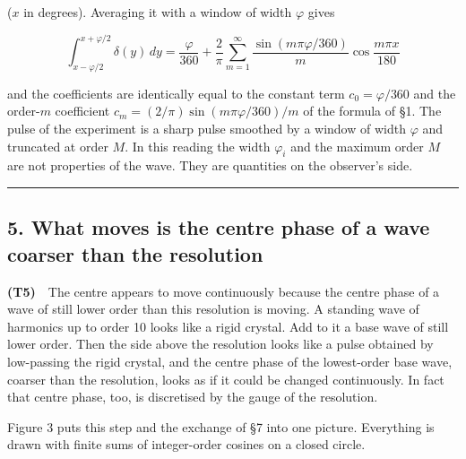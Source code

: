 \documentclass[
  a4paper,
]{article}
\begin{document}
(\(x\) in degrees). Averaging it with a window of width \(\varphi\)
gives

\[
\int_{x-\varphi/2}^{x+\varphi/2}\delta(y)\,dy=\frac{\varphi}{360}+\frac{2}{\pi}\sum_{m=1}^{\infty}\frac{\sin(m\pi\varphi/360)}{m}\cos\frac{m\pi x}{180}
\]

and the coefficients are identically equal to the constant term
\(c_0=\varphi/360\) and the order-\(m\) coefficient
\(c_m=(2/\pi)\sin(m\pi\varphi/360)/m\) of the formula of §1. The pulse
of the experiment is a sharp pulse smoothed by a window of width
\(\varphi\) and truncated at order \(M\). In this reading the width
\(\varphi_i\) and the maximum order \(M\) are not properties of the
wave. They are quantities on the observer's side.

\begin{center}\rule{0.5\linewidth}{0.5pt}\end{center}

\subsection{5. What moves is the centre phase of a wave coarser than the
resolution}\label{what-moves-is-the-centre-phase-of-a-wave-coarser-than-the-resolution}

\textbf{(T5)}　The centre appears to move continuously because the
centre phase of a wave of still lower order than this resolution is
moving. A standing wave of harmonics up to order 10 looks like a rigid
crystal. Add to it a base wave of still lower order. Then the side above
the resolution looks like a pulse obtained by low-passing the rigid
crystal, and the centre phase of the lowest-order base wave, coarser
than the resolution, looks as if it could be changed continuously. In
fact that centre phase, too, is discretised by the gauge of the
resolution.

Figure 3 puts this step and the exchange of §7 into one picture.
Everything is drawn with finite sums of integer-order cosines on a
closed circle.
\end{document}
